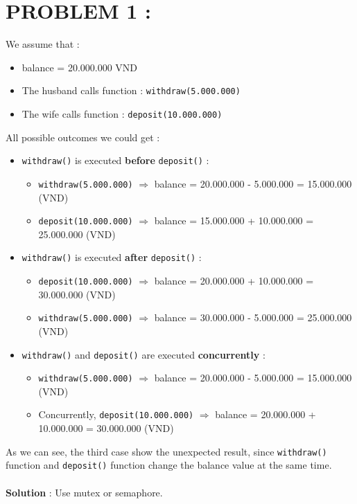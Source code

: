 \documentclass[a4paper]{article}
\begin{document}

\newpage
\tableofcontents
\newpage

\section{PROBLEM 1 :}
We assume that :
\begin{itemize}
\item balance = 20.000.000 VND 
\item The husband calls function : \texttt{withdraw(5.000.000)}
\item The wife calls function : \texttt{deposit(10.000.000)}
\end{itemize}
All possible outcomes we could get :

\begin{itemize}

\item \texttt{withdraw()} is executed \textbf{before} \texttt{deposit()} :
\begin{itemize}
\item \texttt{withdraw(5.000.000)} $\Rightarrow$ balance = 20.000.000 - 5.000.000 = 15.000.000 (VND) 
\item \texttt{deposit(10.000.000)} $\Rightarrow$ balance = 15.000.000 + 10.000.000 = 25.000.000 (VND)
\end{itemize}

\item \texttt{withdraw()} is executed \textbf{after} \texttt{deposit()} :
\begin{itemize}
\item \texttt{deposit(10.000.000)} $\Rightarrow$ balance = 20.000.000 + 10.000.000 = 30.000.000 (VND) 
\item \texttt{withdraw(5.000.000)} $\Rightarrow$ balance = 30.000.000 - 5.000.000 = 25.000.000 (VND)
\end{itemize}
	
\item \texttt{withdraw()} and \texttt{deposit()} are executed \textbf{concurrently} :
\begin{itemize}
\item \texttt{withdraw(5.000.000)} $\Rightarrow$ balance = 20.000.000 - 5.000.000 = 15.000.000 (VND) 
\item Concurrently, \texttt{deposit(10.000.000)} $\Rightarrow$ balance = 20.000.000 + 10.000.000 = 30.000.000 (VND)
\end{itemize}
\end{itemize}
As we can see, the third case show the unexpected result, since \texttt{withdraw()} function and \texttt{deposit()} function change the balance value at the same time. \\
\\
\textbf{Solution} : Use mutex or semaphore. 
\end{document}
